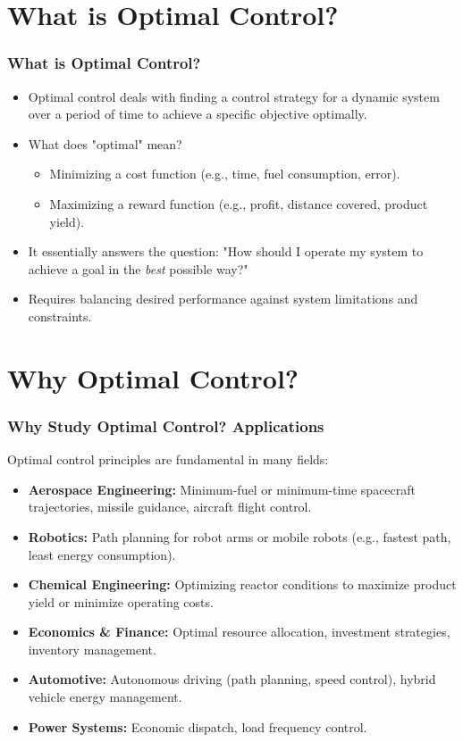 \documentclass{beamer}
\begin{document}
\section{What is Optimal Control?}
\begin{frame}
\frametitle{What is Optimal Control?}
    \begin{itemize}
        \item Optimal control deals with finding a control strategy for a dynamic system over a period of time to achieve a specific objective optimally.
        \item What does "optimal" mean?
        \begin{itemize}
            \item Minimizing a cost function (e.g., time, fuel consumption, error).
            \item Maximizing a reward function (e.g., profit, distance covered, product yield).
        \end{itemize}
        \item It essentially answers the question: "How should I operate my system to achieve a goal in the \emph{best} possible way?"
        \item Requires balancing desired performance against system limitations and constraints.
    \end{itemize}
\end{frame}

\section{Why Optimal Control?}
\begin{frame}
\frametitle{Why Study Optimal Control? Applications}
    Optimal control principles are fundamental in many fields:
    \begin{itemize}
        \item \textbf{Aerospace Engineering:} Minimum-fuel or minimum-time spacecraft trajectories, missile guidance, aircraft flight control.
        \item \textbf{Robotics:} Path planning for robot arms or mobile robots (e.g., fastest path, least energy consumption).
        \item \textbf{Chemical Engineering:} Optimizing reactor conditions to maximize product yield or minimize operating costs.
        \item \textbf{Economics \& Finance:} Optimal resource allocation, investment strategies, inventory management.
        \item \textbf{Automotive:} Autonomous driving (path planning, speed control), hybrid vehicle energy management.
        \item \textbf{Power Systems:} Economic dispatch, load frequency control.
    \end{itemize}
\end{frame}
\end{document}
